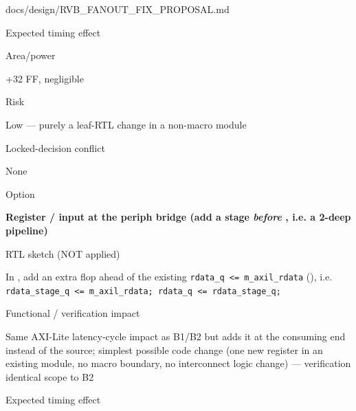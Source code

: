 \begin{relocated}{docs/design/RVB_FANOUT_FIX_PROPOSAL.md}
\begin{rowtable}
\begin{rowcell}{Expected timing effect}
\end{rowcell}

\begin{rowcell}{Area/\allowbreak{}power}

+32 FF, negligible

\end{rowcell}

\begin{rowcell}{Risk}

Low --- purely a leaf-RTL change in a non-macro module

\end{rowcell}

\begin{rowcell}{Locked-decision conflict}

None

\end{rowcell}


\begin{rowcell}{Option}

\textbf{Register / input at the periph
bridge (add a stage \emph{before} , i.e. a 2-deep
pipeline)}

\end{rowcell}

\begin{rowcell}{RTL sketch (NOT applied)}

In , add an extra flop ahead of the existing
\texttt{rdata\_\allowbreak{}q\ <=\allowbreak{}\ m\_\allowbreak{}axil\_\allowbreak{}rdata}
(), i.e.
\texttt{rdata\_\allowbreak{}stage\_\allowbreak{}q\ <=\allowbreak{}\ m\_\allowbreak{}axil\_\allowbreak{}rdata;\ rdata\_\allowbreak{}q\ <=\allowbreak{}\ rdata\_\allowbreak{}stage\_\allowbreak{}q;}

\end{rowcell}

\begin{rowcell}{Functional / verification impact}

Same AXI-Lite latency-cycle impact as B1/B2 but adds it at the consuming
end instead of the source; simplest possible code change (one new
register in an existing module, no macro boundary, no interconnect logic
change) --- verification identical scope to B2

\end{rowcell}

\begin{rowcell}{Expected timing effect}


\end{rowcell}
\end{rowtable}
\end{relocated}
